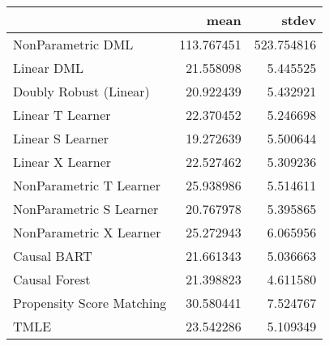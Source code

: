 \begin{tabular}{lrr}
\toprule
{} &        mean &       stdev \\
\midrule
NonParametric DML         &  113.767451 &  523.754816 \\
Linear DML                &   21.558098 &    5.445525 \\
Doubly Robust (Linear)    &   20.922439 &    5.432921 \\
Linear T Learner          &   22.370452 &    5.246698 \\
Linear S Learner          &   19.272639 &    5.500644 \\
Linear X Learner          &   22.527462 &    5.309236 \\
NonParametric T Learner   &   25.938986 &    5.514611 \\
NonParametric S Learner   &   20.767978 &    5.395865 \\
NonParametric X Learner   &   25.272943 &    6.065956 \\
Causal BART               &   21.661343 &    5.036663 \\
Causal Forest             &   21.398823 &    4.611580 \\
Propensity Score Matching &   30.580441 &    7.524767 \\
TMLE                      &   23.542286 &    5.109349 \\
\bottomrule
\end{tabular}
